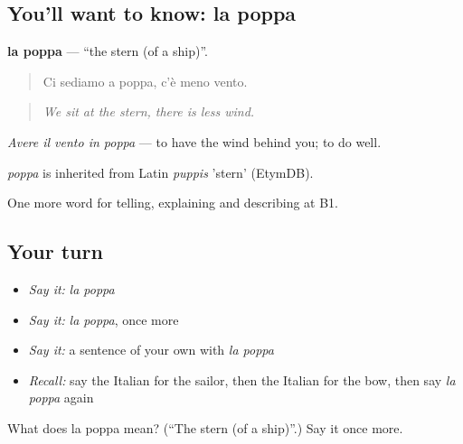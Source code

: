 \subsection*{You'll want to know: la poppa}
\textbf{la poppa} — \textquotedblleft{}the stern (of a ship)\textquotedblright{}.

\begin{quote}
Ci sediamo a poppa, c'è meno vento.
\end{quote}

\begin{quote}
\emph{We sit at the stern, there is less wind.}
\end{quote}

\emph{Avere il vento in poppa} — to have the wind behind you; to do well.

\begin{cousinweb}
\emph{poppa} is inherited from Latin \emph{puppis} 'stern' (EtymDB).
\end{cousinweb}

\begin{grammarlens}[title={What you've built}]
One more word for telling, explaining and describing at B1.
\end{grammarlens}

\subsection*{Your turn}
\begin{itemize}
\raggedright
  \item \emph{Say it:} \emph{la poppa}
  \item \emph{Say it:} \emph{la poppa}, once more
  \item \emph{Say it:} a sentence of your own with \emph{la poppa}
  \item \emph{Recall:} say the Italian for the sailor, then the Italian for the bow, then say \emph{la poppa} again
\end{itemize}

\begin{tcolorbox}[breakable,colback=teal!4,colframe=teal!35!black,title={Before you move on}]
What does la poppa mean? (\textquotedblleft{}The stern (of a ship)\textquotedblright{}.) Say it once more.
\end{tcolorbox}

